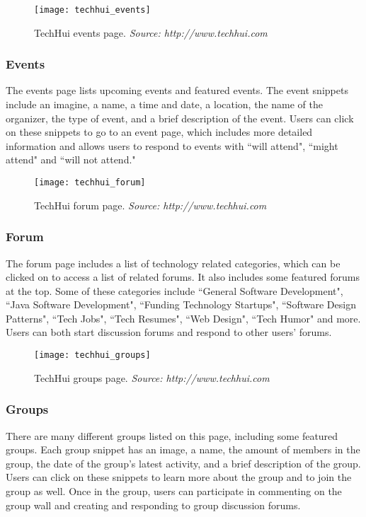 \begin{figure}[h]
\centering
\texttt{[image: techhui\_events]}
\caption{TechHui events page. \textit{Source: http://www.techhui.com}}
\end{figure}
\subsubsection{Events}
The events page lists upcoming events and featured events. The event snippets include an imagine, a name, a time and date, a location, the name of the organizer, the type of event, and a brief description of the event. Users can click on these snippets to go to an event page, which includes more detailed information and allows users to respond to events with ``will attend", ``might attend" and ``will not attend." 

\begin{figure}[h]
\centering
\texttt{[image: techhui\_forum]}
\caption{TechHui forum page. \textit{Source: http://www.techhui.com}}
\end{figure}
\subsubsection{Forum}
The forum page includes a list of technology related categories, which can be clicked on to access a list of related forums. It also includes some featured forums at the top. Some of these categories include ``General Software Development", ``Java Software Development", ``Funding Technology Startups", ``Software Design Patterns", ``Tech Jobs", ``Tech Resumes", ``Web Design", ``Tech Humor" and more. Users can both start discussion forums and respond to other users' forums. 

\begin{figure}[h]
\centering
\texttt{[image: techhui\_groups]}
\caption{TechHui groups page. \textit{Source: http://www.techhui.com}}
\end{figure}
\subsubsection{Groups}
There are many different groups listed on this page, including some featured groups. Each group snippet has an image, a name, the amount of members in the group, the date of the group's latest activity, and a brief description of the group. Users can click on these snippets to learn more about the group and to join the group as well. Once in the group, users can participate in commenting on the group wall and creating and responding to group discussion forums. 

